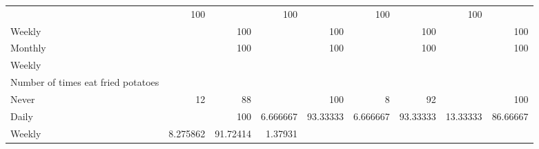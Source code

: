 \documentclass{article}
\begin{document}
\begin{table}[!h]
{\begin{tabular}{lllllllll}
				\multicolumn{1}{|r}{} &
				\multicolumn{1}{r}{100} &
				\multicolumn{1}{r}{} &
				\multicolumn{1}{r}{100} &
				\multicolumn{1}{r}{} &
				\multicolumn{1}{r}{100} &
				\multicolumn{1}{r}{} &
				\multicolumn{1}{r}{100} \\
				\multicolumn{1}{l}{\hspace{5em}Weekly} &
				\multicolumn{1}{|r}{} &
				\multicolumn{1}{r}{100} &
				\multicolumn{1}{r}{} &
				\multicolumn{1}{r}{100} &
				\multicolumn{1}{r}{} &
				\multicolumn{1}{r}{100} &
				\multicolumn{1}{r}{} &
				\multicolumn{1}{r}{100} \\
				\multicolumn{1}{l}{\hspace{5em}Monthly} &
				\multicolumn{1}{|r}{} &
				\multicolumn{1}{r}{100} &
				\multicolumn{1}{r}{} &
				\multicolumn{1}{r}{100} &
				\multicolumn{1}{r}{} &
				\multicolumn{1}{r}{100} &
				\multicolumn{1}{r}{} &
				\multicolumn{1}{r}{100} \\
				\multicolumn{1}{l}{\hspace{3em}Weekly} &
				\multicolumn{1}{|r}{} &
				\multicolumn{1}{r}{} &
				\multicolumn{1}{r}{} &
				\multicolumn{1}{r}{} &
				\multicolumn{1}{r}{} &
				\multicolumn{1}{r}{} &
				\multicolumn{1}{r}{} &
				\multicolumn{1}{r}{} \\
				\multicolumn{1}{l}{\hspace{4em}Number of times eat fried potatoes} &
				\multicolumn{1}{|r}{} &
				\multicolumn{1}{r}{} &
				\multicolumn{1}{r}{} &
				\multicolumn{1}{r}{} &
				\multicolumn{1}{r}{} &
				\multicolumn{1}{r}{} &
				\multicolumn{1}{r}{} &
				\multicolumn{1}{r}{} \\
				\multicolumn{1}{l}{\hspace{5em}Never} &
				\multicolumn{1}{|r}{12} &
				\multicolumn{1}{r}{88} &
				\multicolumn{1}{r}{} &
				\multicolumn{1}{r}{100} &
				\multicolumn{1}{r}{8} &
				\multicolumn{1}{r}{92} &
				\multicolumn{1}{r}{} &
				\multicolumn{1}{r}{100} \\
				\multicolumn{1}{l}{\hspace{5em}Daily} &
				\multicolumn{1}{|r}{} &
				\multicolumn{1}{r}{100} &
				\multicolumn{1}{r}{6.666667} &
				\multicolumn{1}{r}{93.33333} &
				\multicolumn{1}{r}{6.666667} &
				\multicolumn{1}{r}{93.33333} &
				\multicolumn{1}{r}{13.33333} &
				\multicolumn{1}{r}{86.66667} \\
				\multicolumn{1}{l}{\hspace{5em}Weekly} &
				\multicolumn{1}{|r}{8.275862} &
				\multicolumn{1}{r}{91.72414} &
				\multicolumn{1}{r}{1.37931} &

\end{tabular}}
\end{table}
\end{document}
